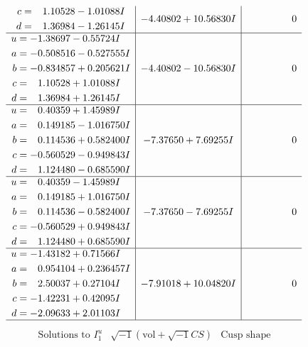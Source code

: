 \documentclass[1p]{elsarticle_modified}
\theoremstyle{definition}
\newcommand{\I}{\sqrt{-1}}
\begin{document}
$$\begin{array}{c|c|c}
\begin{aligned}
c &= \phantom{-}1.10528 - 1.01088 I \\
d &= \phantom{-}1.36984 - 1.26145 I\end{aligned}
 & -4.40802 + 10.56830 I & \phantom{-0.000000 } 0 \\ \hline\begin{aligned}
u &= -1.38697 - 0.55724 I \\
a &= -0.508516 - 0.527555 I \\
b &= -0.834857 + 0.205621 I \\
c &= \phantom{-}1.10528 + 1.01088 I \\
d &= \phantom{-}1.36984 + 1.26145 I\end{aligned}
 & -4.40802 - 10.56830 I & \phantom{-0.000000 } 0 \\ \hline\begin{aligned}
u &= \phantom{-}0.40359 + 1.45989 I \\
a &= \phantom{-}0.149185 - 1.016750 I \\
b &= \phantom{-}0.114536 + 0.582400 I \\
c &= -0.560529 - 0.949843 I \\
d &= \phantom{-}1.124480 - 0.685590 I\end{aligned}
 & -7.37650 + 7.69255 I & \phantom{-0.000000 } 0 \\ \hline\begin{aligned}
u &= \phantom{-}0.40359 - 1.45989 I \\
a &= \phantom{-}0.149185 + 1.016750 I \\
b &= \phantom{-}0.114536 - 0.582400 I \\
c &= -0.560529 + 0.949843 I \\
d &= \phantom{-}1.124480 + 0.685590 I\end{aligned}
 & -7.37650 - 7.69255 I & \phantom{-0.000000 } 0 \\ \hline\begin{aligned}
u &= -1.43182 + 0.71566 I \\
a &= \phantom{-}0.954104 + 0.236457 I \\
b &= \phantom{-}2.50037 + 0.27104 I \\
c &= -1.42231 + 0.42095 I \\
d &= -2.09633 + 2.01103 I\end{aligned}
 & -7.91018 + 10.04820 I & \phantom{-0.000000 } 0\\
 \hline 
 \end{array}$$\newpage$$\begin{array}{c|c|c}  
\text{Solutions to }I^u_{1}& \I (\text{vol} + \sqrt{-1}CS) & \text{Cusp shape}\\

\end{array}$$
\end{document}
